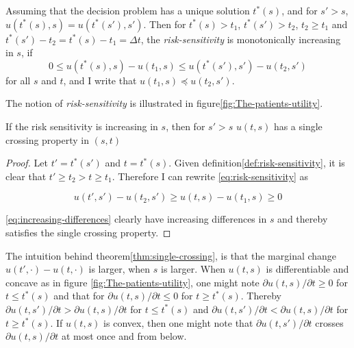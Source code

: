 \documentclass[10pt,a4paper]{article} %
\begin{document}
\begin{defn}
\label{def:risk-sensitivity} 
Assuming that the decision problem has a unique solution $t^{*}(s)$, and for $s'>s$, $u(t^{*}(s),s)=u(t^{*}(s'),s')$. Then for $t^{*}(s)>t_{1}$, $t^{*}(s')>t_{2}$, $t_{2}\ge t_{1}$ and $t^{*}(s')-t_{2}=t^{*}(s)-t_{1}=\Delta t$, the \emph{risk-sensitivity} is monotonically increasing in $s$, if
\begin{equation}
0\le u(t^{*}(s),s)-u(t_{1},s)\le u(t^{*}(s'),s')-u(t_{2},s')\label{eq:risk-sensitivity}
\end{equation}
for all $s$ and $t$, and I write that $u(t_{1},s)\preceq u(t_{2},s')$.
\end{defn}

The notion of \emph{risk-sensitivity} is illustrated in figure\ref{fig:The-patients-utility}.

\begin{thm}
\label{thm:single-crossing} 
If the risk sensitivity is increasing in $s$, then for $s'>s$ $u(t,s)$ has a single crossing property in $(s,t)$
\end{thm}

\begin{proof}
Let $t'=t^{*}(s')$ and $t=t^{*}(s)$. Given definition\ref{def:risk-sensitivity}, it is clear that $t'\ge t_{2}>t\ge t_{1}$. Therefore I can rewrite
\eqref{eq:risk-sensitivity} as

\begin{equation}
u(t',s')-u(t_{2},s')\ge u(t,s)-u(t_{1},s)\ge0\label{eq:increasing-differences}
\end{equation}

\eqref{eq:increasing-differences} clearly have increasing differences in $s$ and thereby satisfies the single crossing property.
\end{proof}

The intuition behind theorem\ref{thm:single-crossing}, is that the marginal change $u(t',\cdot)-u(t,\cdot)$ is larger, when $s$ is larger. When $u(t,s)$ is differentiable and concave as in figure \ref{fig:The-patients-utility}, one might note $\partial u(t,s)/\partial t\ge0$ for $t\le t^{*}(s)$ and that for $\partial u(t,s)/\partial t\le0$ for $t\ge t^{*}(s)$. Thereby $\partial u(t,s')/\partial t>\partial u(t,s)/\partial t$ for $t\le t^{*}(s)$ and $\partial u(t,s')/\partial t<\partial u(t,s)/\partial t$ for $t\ge t^{*}(s)$. If $u(t,s)$ is convex, then one might note that $\partial u(t,s')/\partial t$ crosses $\partial u(t,s)/\partial t$ at most once and from below.
\end{document}

